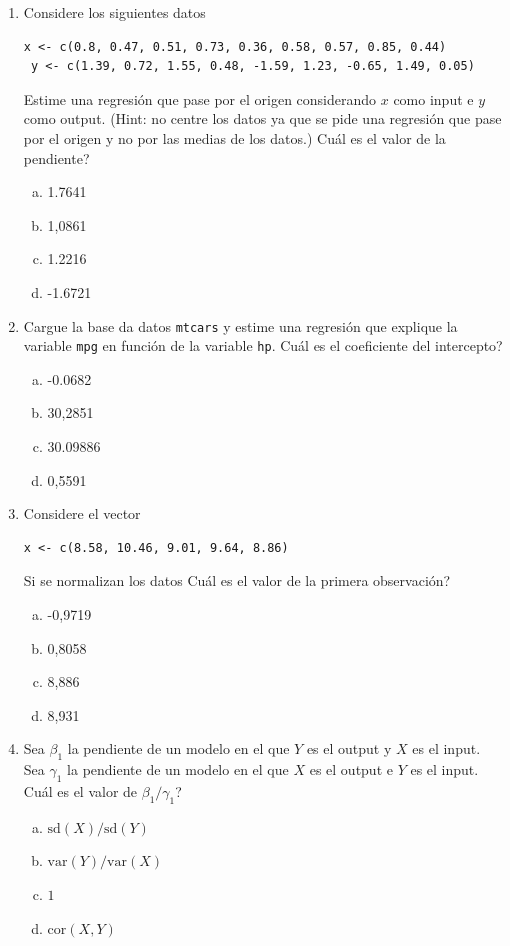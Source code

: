 \documentclass[11pt,oneside,spanish]{article}
\theoremstyle{definition}
\theoremstyle{definition}\newtheorem{definicion}{Definicin}
\theoremstyle{definition}\newtheorem{ejemplo}{Ejemplo}
\theoremstyle{remark}\newtheorem{nota}{\textsc{Nota}}
\theoremstyle{definition}\newtheorem{proposicion}{Proposicin}
\theoremstyle{definition}\newtheorem{problema}{Problema}
\begin{document}
\begin{enumerate}[(1)]
\item Considere los siguientes datos
\begin{lstlisting}[backgroundcolor=\color{Gray!20},frame=none,basicstyle=\ttfamily]
 x <- c(0.8, 0.47, 0.51, 0.73, 0.36, 0.58, 0.57, 0.85, 0.44)
 y <- c(1.39, 0.72, 1.55, 0.48, -1.59, 1.23, -0.65, 1.49, 0.05)
\end{lstlisting}
Estime una regresi\'on que pase por el origen considerando $x$ como input e $y$ como output. (Hint: no centre los datos ya que se pide una regresi\'on 	que pase por el origen y no por las medias de los datos.)
{\textquestiondown}Cu\'al es el valor de la pendiente?
	\begin{enumerate}[(a)]
	\item 1.7641 
	\item 1,0861
	\item 1.2216
	\item -1.6721
	\end{enumerate}
	
\newpage
	
\item Cargue la  base da datos \texttt{mtcars} y estime una regresi\'on que explique la variable \texttt{mpg} en funci\'on de la variable \texttt{hp}. {\textquestiondown}Cu\'al es el coeficiente del intercepto?	
	\begin{enumerate}[(a)]
	\item -0.0682
	\item 30,2851
	\item 30.09886
	\item 0,5591
	\end{enumerate}

\item Considere el vector 
\begin{lstlisting}[backgroundcolor=\color{Gray!20},frame=none,basicstyle=\ttfamily]
 x <- c(8.58, 10.46, 9.01, 9.64, 8.86)
\end{lstlisting}
Si se normalizan los datos {\textquestiondown}Cu\'al es el valor de la primera observaci\'on?	
	\begin{enumerate}[(a)]
	\item -0,9719
	\item 0,8058
	\item 8,886
	\item 8,931
	\end{enumerate}

\item Sea $\beta_1$ la pendiente de un modelo en el que $Y$ es el output y $X$ es el input. Sea $\gamma_1$ la pendiente de un modelo en el que $X$ es el output e $Y$ es el input. {\textquestiondown}Cu\'al es el valor de $\beta_1 / \gamma_1$?		
	\begin{enumerate}[(a)]
	\item $\text{sd}(X)/\text{sd}(Y)$
	\item $\text{var}(Y)/\text{var}(X)$
	\item $1$
	\item $\text{cor}(X,Y)$
	\end{enumerate}


\end{enumerate}
\end{document}
